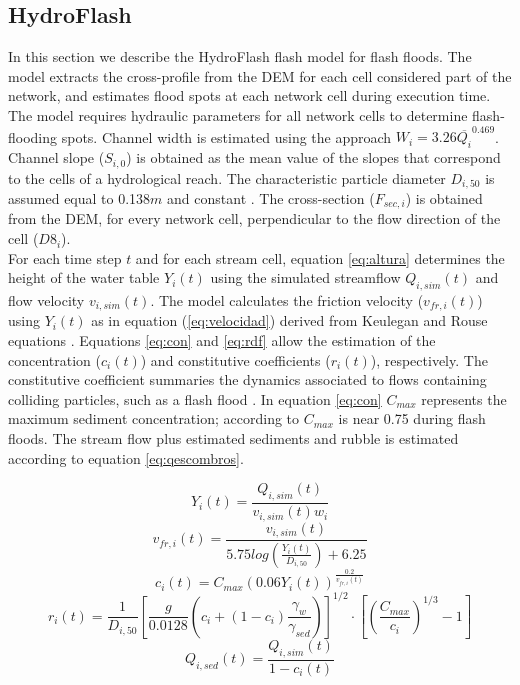 \documentclass[hess, manuscript]{copernicus}
\begin{document}
\subsection{HydroFlash}

In this section we describe the HydroFlash flash model for flash floods. The model extracts the cross-profile from the DEM  for each cell considered part of the network,  and estimates flood spots at each network cell during execution time.\\

The model requires hydraulic parameters for all network cells to determine flash-flooding spots.  Channel width is estimated using the \cite{Leopold1953} approach $ W_i = 3.26 \overline{Q_i}^{0.469}$.  Channel slope ($S_{i,0}$) is obtained as the mean value of the slopes that correspond to the cells of a hydrological reach. The  characteristic particle diameter $D_{i,50}$ is assumed equal to 0.138$m$ and constant \citep{Golden2006}.  The cross-section ($F_{sec,i}$) is obtained from the DEM, for every network cell,  perpendicular to the flow direction of the cell ($D8_{i}$).\\

For each time step $t$ and for each stream cell, equation \ref{eq:altura} determines the height of the water table $Y_{i}(t)$ using the simulated streamflow $Q_{i,sim}(t)$ and flow velocity $v_{i,sim}(t)$. The model calculates the friction velocity ($v_{fr,i}(t)$) using $Y_i(t)$ as in equation (\ref{eq:velocidad}) derived from Keulegan and Rouse equations \citep{takahashi1991, Savage1984}. Equations \ref{eq:con} and \ref{eq:rdf} allow the estimation of the concentration ($c_{i}(t)$) and constitutive coefficients ($r_{i}(t)$), respectively. The constitutive coefficient summaries the dynamics associated to flows containing colliding particles, such as a flash flood \citep{takahashi1991}.  In equation \ref{eq:con} $C_{max}$ represents the maximum sediment concentration;  according to \citet{Obrien1988} $C_{max}$ is near 0.75 during flash floods. The stream flow plus estimated sediments and rubble is estimated according to equation \ref{eq:qescombros}.

\begin{equation}
 Y_i(t) = \frac{Q_{i,sim}(t)}{v_{i,sim}(t) w_{i}}
 \label{eq:altura}
\end{equation}
\begin{equation}
 v_{fr,i}(t) = \frac{v_{i,sim}(t)}{5.75 log \left( \frac{Y_{i}(t)}{D_{i,50}} \right) + 6.25}
 \label{eq:velocidad}
\end{equation}
\begin{equation}
 c_{i}(t) = C_{max} (0.06 Y_{i}(t))^{\frac{0.2}{v_{fr,i}(t)}}
 \label{eq:con}
\end{equation}
\begin{equation}
r_{i}(t) = \frac{1}{D_{i,50}} \left [ \frac{g}{0.0128} \left( c_i+(1-c_i) \frac{\gamma_w}{\gamma_{sed}} \right ) \right ]^{1/2} \cdot \left[ \left( \frac{C_{max}}{c_i} \right )^{1/3} -1\right ]
 \label{eq:rdf}
\end{equation}
\begin{equation}
 Q_{i,sed}(t) = \frac{Q_{i,sim}(t)}{1-c_i(t)}
 \label{eq:qescombros}
\end{equation}
\end{document}
